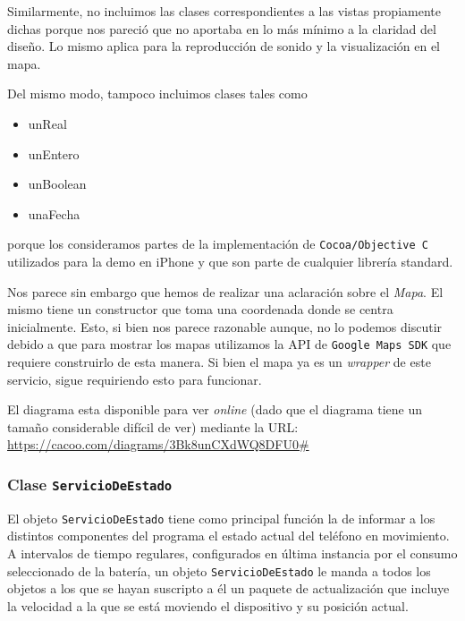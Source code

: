 \documentclass[10pt, a4paper,english,spanish]{article}
\begin{document}
Similarmente, no incluimos las clases correspondientes a las vistas propiamente dichas porque nos pareció que no aportaba en lo más mínimo a la claridad del diseño. Lo mismo aplica para la reproducción de sonido y la visualización en el mapa. 

Del mismo modo, tampoco incluimos clases tales como 
\begin{itemize}
	\item unReal
	\item unEntero
	\item unBoolean
	\item unaFecha
\end{itemize}
porque los consideramos partes de la implementación de \texttt{Cocoa/Objective C} utilizados para la demo en iPhone y que son parte de cualquier librería standard.

Nos parece sin embargo que hemos de realizar una aclaración sobre el \textit{Mapa}. El mismo tiene un constructor que toma una coordenada donde se centra inicialmente. Esto, si bien nos parece razonable aunque, no lo podemos discutir debido a que para mostrar los mapas utilizamos la API de \texttt{Google Maps SDK} que requiere construirlo de esta manera. Si bien el mapa ya es un \textit{wrapper} de este servicio, sigue requiriendo esto para funcionar.

El diagrama esta disponible para ver \textit{online} (dado que el diagrama tiene un tamaño considerable difícil de ver) mediante la URL: \url{https://cacoo.com/diagrams/3Bk8unCXdWQ8DFU0#}

\subsubsection{Clase \texttt{ServicioDeEstado}}
El objeto \texttt{ServicioDeEstado} tiene como principal función la de informar a los distintos componentes del programa el estado actual del teléfono en movimiento. A intervalos de tiempo regulares, configurados en última instancia por el consumo seleccionado de la batería, un objeto \texttt{ServicioDeEstado} le manda a todos los objetos a los que se hayan suscripto a él un paquete de actualización que incluye la velocidad a la que se está moviendo el dispositivo y su posición actual.
\end{document}
